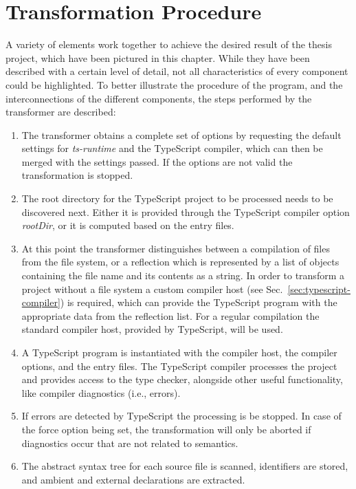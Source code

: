 \section{Transformation Procedure} %
\label{sec:transformation-process}
A variety of elements work together to achieve the desired result of the thesis project, which have been pictured in this chapter. While they have been described with a certain level of detail, not all characteristics of every component could be highlighted. To better illustrate the procedure of the program, and the interconnections of the different components, the steps performed by the transformer are described:
\begin{enumerate}
  \item The transformer obtains a complete set of options by requesting the default settings for \emph{ts-runtime} and the TypeScript compiler, which can then be merged with the settings passed. If the options are not valid the transformation is stopped.
  \item The root directory for the TypeScript project to be processed needs to be discovered next. Either it is provided through the TypeScript compiler option \emph{rootDir}, or it is computed based on the entry files.
  \item At this point the transformer distinguishes between a compilation of files from the file system, or a reflection which is represented by a list of objects containing the file name and its contents as a string. In order to transform a project without a file system a custom compiler host (see Sec.~\ref{sec:typescript-compiler}) is required, which can provide the TypeScript program with the appropriate data from the reflection list. For a regular compilation the standard compiler host, provided by TypeScript, will be used.
  \item A TypeScript program is instantiated with the compiler host, the compiler options, and the entry files. The TypeScript compiler processes the project and provides access to the type checker, alongside other useful functionality, like compiler diagnostics (i.e., errors).
  \item If errors are detected by TypeScript the processing is be stopped. In case of the force option being set, the transformation will only be aborted if diagnostics occur that are not related to semantics.
  \item The abstract syntax tree for each source file is scanned, identifiers are stored, and ambient and external declarations are extracted.

\end{enumerate}
